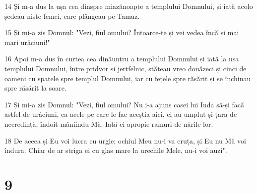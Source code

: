 \par 14 Și m-a dus la ușa cea dinspre miazănoapte a templului Domnului, și iată acolo ședeau niște femei, care plângeau pe Tamuz.
\par 15 Și mi-a zis Domnul: "Vezi, fiul omului? Întoarce-te și vei vedea încă și mai mari urâciuni!"
\par 16 Apoi m-a dus în curtea cea dinăuntru a templului Domnului și iată la ușa templului Domnului, între pridvor și jertfelnic, stăteau vreo douăzeci și cinci de oameni cu spatele spre templul Domnului, iar cu fețele spre răsărit și se închinau spre răsărit la soare.
\par 17 Și mi-a zis Domnul: "Vezi, fiul omului? Nu i-a ajuns casei lui Iuda să-și facă astfel de urâciuni, ca acele pe care le fac aceștia aici, ci au umplut și țara de necredință, îndoit mâniindu-Mă. Iată ei apropie ramuri de nările lor.
\par 18 De aceea și Eu voi lucra cu urgie; ochiul Meu nu-i va cruța, și Eu nu Mă voi îndura. Chiar de ar striga ei cu glas mare la urechile Mele, nu-i voi auzi".

\chapter{9}

